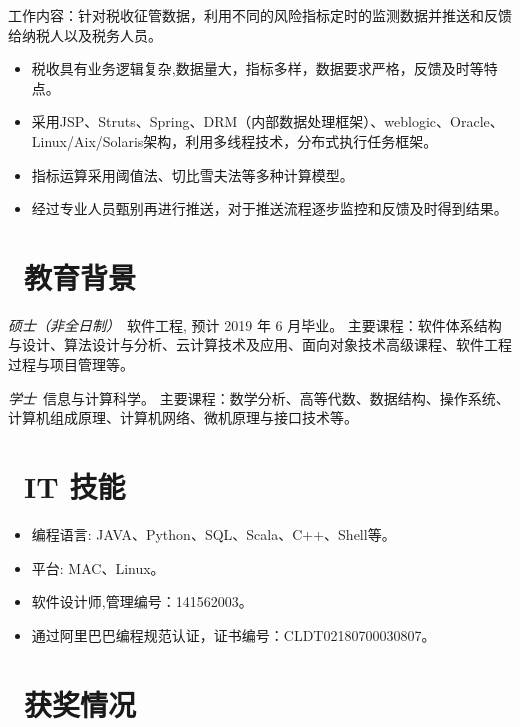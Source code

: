 \documentclass{resume}
\begin{document}
\begin{onehalfspacing}
工作内容：针对税收征管数据，利用不同的风险指标定时的监测数据并推送和反馈给纳税人以及税务人员。
\begin{itemize}
  \item 税收具有业务逻辑复杂,数据量大，指标多样，数据要求严格，反馈及时等特点。
  \item 采用JSP、Struts、Spring、DRM（内部数据处理框架）、weblogic、Oracle、Linux/Aix/Solaris架构，利用多线程技术，分布式执行任务框架。
  \item 指标运算采用阈值法、切比雪夫法等多种计算模型。
  \item 经过专业人员甄别再进行推送，对于推送流程逐步监控和反馈及时得到结果。
\end{itemize}
\end{onehalfspacing}


\section{\faGraduationCap\  教育背景}
\textit{硕士（非全日制）}\ 软件工程, 预计 2019 年 6 月毕业。
 主要课程：软件体系结构与设计、算法设计与分析、云计算技术及应用、面向对象技术高级课程、软件工程过程与项目管理等。

\textit{学士}\ 信息与计算科学。
 主要课程：数学分析、高等代数、数据结构、操作系统、计算机组成原理、计算机网络、微机原理与接口技术等。



\section{\faCogs\ IT 技能}
\begin{itemize}[parsep=0.5ex]
  \item 编程语言: JAVA、Python、SQL、Scala、C++、Shell等。
  \item 平台: MAC、Linux。
  \item 软件设计师,管理编号：141562003。
  \item 通过阿里巴巴编程规范认证，证书编号：CLDT02180700030807。
\end{itemize}

\section{\faHeartO\ 获奖情况}
\end{document}
